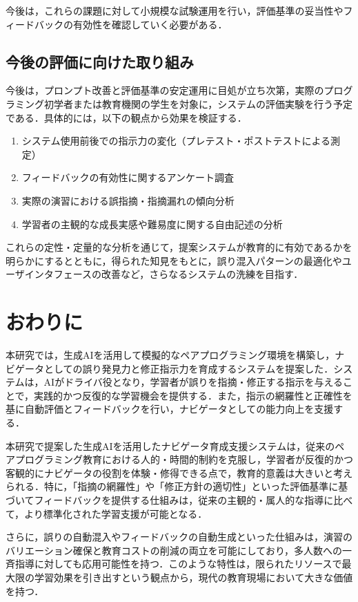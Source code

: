 \documentclass[twoside,twocolumn,10pt]{jsarticle}
\begin{document}
今後は，これらの課題に対して小規模な試験運用を行い，評価基準の妥当性やフィードバックの有効性を確認していく必要がある．

\subsection{今後の評価に向けた取り組み}
今後は，プロンプト改善と評価基準の安定運用に目処が立ち次第，実際のプログラミング初学者または教育機関の学生を対象に，システムの評価実験を行う予定である．具体的には，以下の観点から効果を検証する．

\begin{enumerate}
    \item システム使用前後での指示力の変化（プレテスト・ポストテストによる測定）
    \item フィードバックの有効性に関するアンケート調査
    \item 実際の演習における誤指摘・指摘漏れの傾向分析
    \item 学習者の主観的な成長実感や難易度に関する自由記述の分析
\end{enumerate}

これらの定性・定量的な分析を通じて，提案システムが教育的に有効であるかを明らかにするとともに，得られた知見をもとに，誤り混入パターンの最適化やユーザインタフェースの改善など，さらなるシステムの洗練を目指す．


\section{おわりに}\label{sec:おわりに}

本研究では，生成AIを活用して模擬的なペアプログラミング環境を構築し，ナビゲータとしての誤り発見力と修正指示力を育成するシステムを提案した．システムは，AIがドライバ役となり，学習者が誤りを指摘・修正する指示を与えることで，実践的かつ反復的な学習機会を提供する．また，指示の網羅性と正確性を基に自動評価とフィードバックを行い，ナビゲータとしての能力向上を支援する．

本研究で提案した生成AIを活用したナビゲータ育成支援システムは，従来のペアプログラミング教育における人的・時間的制約を克服し，学習者が反復的かつ客観的にナビゲータの役割を体験・修得できる点で，教育的意義は大きいと考えられる．特に，「指摘の網羅性」や「修正方針の適切性」といった評価基準に基づいてフィードバックを提供する仕組みは，従来の主観的・属人的な指導に比べて，より標準化された学習支援が可能となる．

さらに，誤りの自動混入やフィードバックの自動生成といった仕組みは，演習のバリエーション確保と教育コストの削減の両立を可能にしており，多人数への一斉指導に対しても応用可能性を持つ．このような特性は，限られたリソースで最大限の学習効果を引き出すという観点から，現代の教育現場において大きな価値を持つ．
\end{document}
